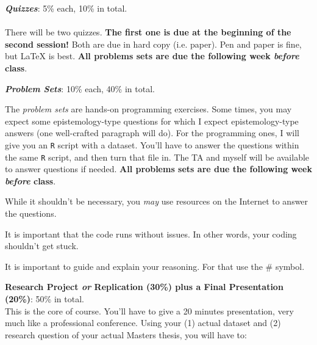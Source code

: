 \documentclass[letterpaper]{article}
\renewenvironment{itemize}{
  \begin{list}{}{
    \setlength{\leftmargin}{1.5em}
  }
}{
  \end{list}
}
\begin{document}
\begin{enumerate}

	\item {\bf \emph{Quizzes}}: 5\% each, 10\% in total.
	\\
  \\
   There will be two quizzes. {\bf The first one is due at the beginning of the second session!} Both are due in hard copy (i.e. paper). Pen and paper is fine, but \LaTeX\; is best. {\bf All problems sets are due the following week \emph{before} class}.

	\item {\bf \emph{Problem Sets}}: 10\% each, 40\% in total.

The \emph{problem sets} are hands-on programming exercises. Some times, you may expect some epistemology-type questions for which I expect epistemology-type answers (one well-crafted paragraph will do). For the programming ones, I will give you an \texttt{R} script with a dataset. You'll have to answer the questions within the same \texttt{R} script, and then turn that file in. The TA and myself will be available to answer questions if needed. {\bf All problems sets are due the following week \emph{before} class}.

\begin{itemize}
		\item[$\diamond$] While it shouldn't be necessary, you \emph{may} use resources on the Internet to answer the questions.
		\item[$\diamond$] It is important that the code runs without issues. In other words, your coding shouldn't get stuck.
		\item[$\diamond$] It is important to guide and explain your reasoning. For that use the \# symbol.
\end{itemize}


\item {\bf Research Project \emph{or} Replication (30\%) plus a Final Presentation (20\%)}: 50\% in total.\\

This is the core of course. You'll have to give a 20 minutes presentation, very much like a professional conference. Using your (1) actual dataset and (2) research question of your actual Masters thesis, you will have to:

\begin{itemize}


\end{itemize}
\end{enumerate}
\end{document}
